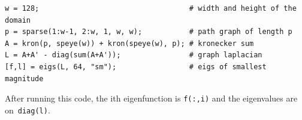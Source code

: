 \begin{verbatim}
w = 128;                                   # width and height of the domain
p = sparse(1:w-1, 2:w, 1, w, w);           # path graph of length p
A = kron(p, speye(w)) + kron(speye(w), p); # kronecker sum
L = A+A' - diag(sum(A+A'));                # graph laplacian
[f,l] = eigs(L, 64, "sm");                 # eigs of smallest magnitude
\end{verbatim}

After running this code, the ith eigenfunction is \verb+f(:,i)+ and the
eigenvalues are on~\verb+diag(l)+.


